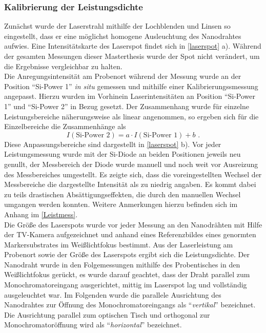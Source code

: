 \subsubsection{Kalibrierung der Leistungsdichte}
Zunächst wurde der Laserstrahl mithilfe der Lochblenden und Linsen so eingestellt, dass er eine möglichst homogene Ausleuchtung des Nanodrahtes aufwies. Eine Intensitätskarte des Laserspot findet sich in \autoref{laserspot} a). Während der gesamten Messungen dieser Masterthesis wurde der Spot nicht verändert, um die Ergebnisse vergleichbar zu halten.\\
Die Anregungsintensität am Probenort während der Messung wurde an der Position ``Si-Power 1'' \textit{in situ} gemessen und mithilfe einer Kalibrierungssmessung angepasst. Hierzu wurden im Vorhinein Laserintensitäten an Position ``Si-Power 1'' und ``Si-Power 2'' in Bezug gesetzt. Der Zusammenhang wurde für einzelne Leistungsbereiche näherungsweise als linear angenommen, so ergeben sich für die Einzelbereiche die Zusammenhänge als
\begin{equation}
I(\text{Si-Power 2})=  a \cdot I(\text{Si-Power 1})  + b \text{ .}
\end{equation}
Diese Anpassungsbereiche sind dargestellt in \autoref{laserspot} b). Vor jeder Leistungsmessung wurde mit der Si-Diode an beiden Positionen jeweils neu genullt, der Messbereich der Diode wurde manuell und noch weit vor Ausreizung des Messbereiches umgestellt. Es zeigte sich, dass die voreingestellten Wechsel der Messbereiche die dargestellte Intensität als zu niedrig angaben. Es kommt dabei zu teils drastischen Absättigungseffekten, die durch den manuellen Wechsel umgangen werden konnten. Weitere Anmerkungen hierzu befinden sich im Anhang im \autoref{Leistmess}. \\
Die Größe des Laserspots wurde vor jeder Messung an den Nanodrähten mit Hilfe der TV-Kamera aufgezeichnet und anhand eines Referenzbildes eines genormten Markersubstrates im Weißlichtfokus bestimmt. Aus der Laserleistung am Probenort sowie der Größe des Laserspots ergibt sich die Leistungsdichte. Der Nanodraht wurde in den Folgemessungen mithilfe des Probentisches in den Weißlichtfokus gerückt, es wurde darauf geachtet, dass der Draht parallel zum Monochromatoreingang ausgerichtet, mittig im Laserspot lag und vollständig ausgeleuchtet war. Im Folgenden wurde die parallele Ausrichtung des Nanodrahtes zur Öffnung des Monochromatoreingangs als ``\textit{vertikal}'' bezeichnet. Die Ausrichtung parallel zum optischen Tisch und orthogonal zur Monochromatoröffnung wird als ``\textit{horizontal}'' bezeichnet.
